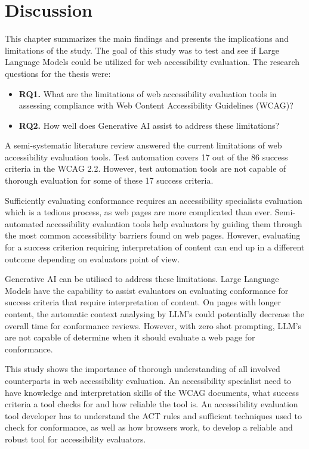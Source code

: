\chapter{Discussion\label{discussion}}

This chapter summarizes the main findings and presents the implications and limitations of the study. The goal of this study was to test and see if Large Language Models could be utilized for web accessibility evaluation. The research questions for the thesis were:

\begin{itemize}
    \item \textbf{RQ1.} What are the limitations of web accessibility evaluation tools in assessing compliance with Web Content Accessibility Guidelines (WCAG)?
    \item \textbf{RQ2.} How well does Generative AI assist to address these limitations?
\end{itemize}

A semi-systematic literature review answered the current limitations of web accessibility evaluation tools. Test automation covers 17 out of the 86 success criteria in the WCAG 2.2. However, test automation tools are not capable of thorough evaluation for some of these 17 success criteria. 

Sufficiently evaluating conformance requires an accessibility specialists evaluation which is a tedious process, as web pages are more complicated than ever. Semi-automated accessibility evaluation tools help evaluators by guiding them through the most common accessibility barriers found on web pages. However, evaluating for a success criterion requiring interpretation of content can end up in a different outcome depending on evaluators point of view.

Generative AI can be utilised to address these limitations. Large Language Models have the capability to assist evaluators on evaluating conformance for success criteria that require interpretation of content. On pages with longer content, the automatic context analysing by LLM's could potentially decrease the overall time for conformance reviews. However, with zero shot prompting, LLM's are not capable of determine when it should evaluate a web page for conformance.

This study shows the importance of thorough understanding of all involved counterparts in web accessibility evaluation. An accessibility specialist need to have knowledge and interpretation skills of the WCAG documents, what success criteria a tool checks for and how reliable the tool is. An accessibility evaluation tool developer has to understand the ACT rules and sufficient techniques used to check for conformance, as well as how browsers work, to develop a reliable and robust tool for accessibility evaluators.


